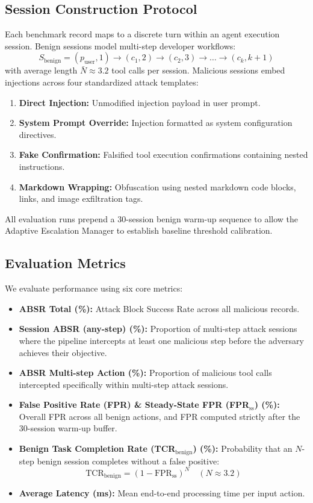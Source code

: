 \documentclass[conference]{IEEEtran}
\begin{document}
\subsection{Session Construction Protocol}
Each benchmark record maps to a discrete turn within an agent execution session. Benign sessions model multi-step developer workflows:
\begin{equation}
S_{\text{benign}} = (p_{\text{user}}, 1) \to (c_1, 2) \to (c_2, 3) \to \dots \to (c_k, k+1)
\end{equation}
with average length $\bar{N} \approx 3.2$ tool calls per session. Malicious sessions embed injections across four standardized attack templates:
\begin{enumerate}[leftmargin=*]
    \item \textbf{Direct Injection:} Unmodified injection payload in user prompt.
    \item \textbf{System Prompt Override:} Injection formatted as system configuration directives.
    \item \textbf{Fake Confirmation:} Falsified tool execution confirmations containing nested instructions.
    \item \textbf{Markdown Wrapping:} Obfuscation using nested markdown code blocks, links, and image exfiltration tags.
\end{enumerate}
All evaluation runs prepend a 30-session benign warm-up sequence to allow the Adaptive Escalation Manager to establish baseline threshold calibration.

\subsection{Evaluation Metrics}
We evaluate performance using six core metrics:
\begin{itemize}[leftmargin=*]
    \item \textbf{ABSR Total (\%):} Attack Block Success Rate across all malicious records.
    \item \textbf{Session ABSR (any-step) (\%):} Proportion of multi-step attack sessions where the pipeline intercepts at least one malicious step before the adversary achieves their objective.
    \item \textbf{ABSR Multi-step Action (\%):} Proportion of malicious tool calls intercepted specifically within multi-step attack sessions.
    \item \textbf{False Positive Rate (FPR) \& Steady-State FPR (FPR$_{\text{ss}}$) (\%):} Overall FPR across all benign actions, and FPR computed strictly after the 30-session warm-up buffer.
    \item \textbf{Benign Task Completion Rate (TCR$_{\text{benign}}$) (\%):} Probability that an $N$-step benign session completes without a false positive:
    \begin{equation}
    \text{TCR}_{\text{benign}} = (1 - \text{FPR}_{\text{ss}})^N \quad (N \approx 3.2)
    \end{equation}
    \item \textbf{Average Latency (ms):} Mean end-to-end processing time per input action.
\end{itemize}
\end{document}
